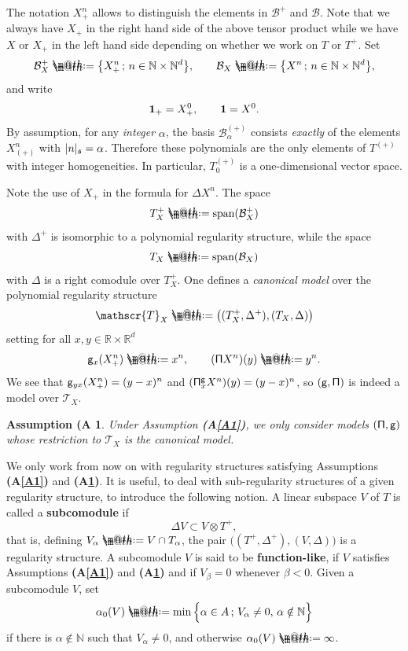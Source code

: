 \documentclass[10pt, reqno]{amsart}
\makeatletter
\numberwithin{subsection}{section}
\numberwithin{subsubsection}{subsection}
\numberwithin{equation}{section} %
\theoremstyle{mystyle}
\theoremstyle{mystyle2}
\theoremstyle{mystyle3}
\newtheorem{assumA}{Assumption (A}
\newcommand{\refA}[1]{\textbf{\textsf{(A\ref{#1})}}}
\newcommand\bbN{\mathbb{N}}
\newcommand\bbR{\mathbb{R}}
\newcommand{\mcB}{\mathcal{B}}
\newcommand{\Xplus}{X_+}
\newcommand*{\defeq}{\mathrel{\rlap{%
                     \raisebox{0.3ex}{$\m@th\cdot$}}%
                     \raisebox{-0.3ex}{$\m@th\cdot$}}%
                     =}
\makeatother
\begin{document}
The notation $\Xplus^n$ allows to distinguish the elements in $\mcB^+$ and $\mcB$. Note that we always have $X_+$ in the right hand side of the above tensor product while we have $X$ or $X_+$ in the left hand side depending on whether we work on $T$ or $T^+$. Set 
$$
\mcB_X^+ \defeq  \big\{\Xplus^n\,;\,n\in \bbN\times\bbN^d\big\}, \qquad \mcB_{X} \defeq  \big\{X^n\,;\,n\in\bbN\times\bbN^d\big\},
$$ 
and write 
$$
{\bf1}_+ = \Xplus^0, \qquad {\bf1}=X^0.
$$ 
By assumption, for any {\it integer} $\alpha$, the basis $\mcB_\alpha^{(+)}$ consists {\it exactly} of the elements $X^n_{(+)}$ with $\vert n\vert_{\frak{s}}=\alpha$. Therefore these polynomials are the 
only elements of $T^{(+)}$ with integer homogeneities. In particular, $T_0^{(+)}$ is a one-dimensional vector space.

Note the use of $X_+$ in the formula for $\Delta X^n$. The space 
$$
T_X^+ \defeq  \text{span}(\mcB_X^+)
$$ 
with $\Delta^+$ is isomorphic to a polynomial regularity structure, while 
the space 
$$
T_X \defeq  \text{span}(\mcB_X)
$$ 
with $\Delta$ is a right comodule over $T_X^+$. One defines a {\it canonical model} over the polynomial regularity structure 
$$
\mathscr{T}_X \defeq  \big((T_X^+,\Delta^+),(T_{X},\Delta)\big)
$$ 
setting for all $x,y\in\bbR\times\bbR^d$
$$
{\sf g}_x(\Xplus^n)\defeq x^n,\qquad
({\sf \Pi}X^n)(y) \defeq  y^n.
$$
We see that ${\sf g}_{yx}(\Xplus^n)=(y-x)^n$ and $({\sf\Pi}_x^{\sf g}X^n)(y)=(y-x)^n$, so $({\sf g}, {\sf \Pi})$ is indeed a model over $\mathscr{T}_X$.

\medskip

\begin{assumA}\label{A2}
Under Assumption \refA{A1}, we only consider models $({\sf\Pi},{\sf g})$ whose restriction to $\mathscr{T}_X$ is the canonical model.
\end{assumA}

\medskip

We only work from now on with regularity structures satisfying Assumptions \refA{A1} and \refA{A2}. It is useful, to deal with sub-regularity structures of a given regularity structure, to introduce the following notion. A linear subspace $V$ of $T$ is called a \textsf{\textbf{subcomodule}} if
$$
\Delta V\subset 
V\otimes T^+,
$$
that is, defining $V_\alpha\defeq V\cap T_\alpha$, the pair $\big((T^+,\Delta^+),(V,\Delta)\big)$ is a regularity structure. A subcomodule $V$ is said to be \textbf{\textsf{function-like}}, if $V$ satisfies Assumptions \refA{A1} and \refA{A2} and if $V_\beta=0$ whenever $\beta<0$. Given a subcomodule $V$, set
$$
\alpha_0(V) \defeq  \min\Big\{\alpha\in A\,;\, V_\alpha\neq0,\, \alpha\notin\bbN\Big\}
$$
if there is $\alpha\notin\bbN$ such that $V_\alpha\neq0$, and otherwise $\alpha_0(V)\defeq\infty$.
\end{document}
